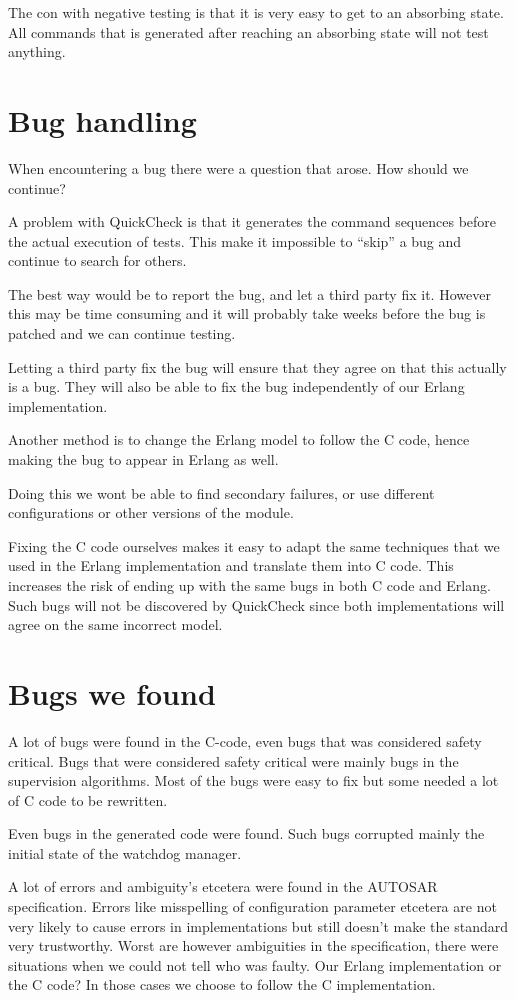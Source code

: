 \documentclass[a4paper]{article}
\begin{document}
The con with negative testing is that it is very easy to get to an
absorbing state. All commands that is generated after reaching an
absorbing state will not test anything.

\section{Bug handling}
When encountering a bug there were a question that arose. How should
we continue?

A problem with QuickCheck is that it generates the command sequences
before the actual execution of tests. This make it impossible to
``skip'' a bug and continue to search for others.

The best way would be to report the bug, and let a third party fix
it. However this may be time consuming and it will probably take weeks
before the bug is patched and we can continue testing.

Letting a third party fix the bug will ensure that they agree on that
this actually is a bug. They will also be able to fix the bug
independently of our Erlang implementation.

Another method is to change the Erlang model to follow the C code,
hence making the bug to appear in Erlang as well.

Doing this we wont be able to find secondary failures, or use
different configurations or other versions of the module.

Fixing the C code ourselves makes it easy to adapt the same techniques
that we used in the Erlang implementation and translate them into C
code.
This increases the risk of ending up with the same bugs in both C code
and Erlang. Such bugs will not be discovered by QuickCheck since both
implementations will agree on the same incorrect model.

\section{Bugs we found}
A lot of bugs were found in the C-code, even bugs that was considered safety
critical.  Bugs that were considered safety critical were mainly bugs in the
supervision algorithms.  Most of the bugs were easy to fix but some needed a
lot of C code to be rewritten.

Even bugs in the generated code were found. Such bugs corrupted mainly the
initial state of the watchdog manager.

A lot of errors and ambiguity's etcetera were found in the AUTOSAR
specification. Errors like misspelling of configuration parameter etcetera are
not very likely to cause errors in implementations but still doesn't make the
standard very trustworthy. Worst are however ambiguities in the specification,
there were situations when we could not tell who was faulty. Our Erlang
implementation or the C code? In those cases we choose to follow the C
implementation.
\end{document}
